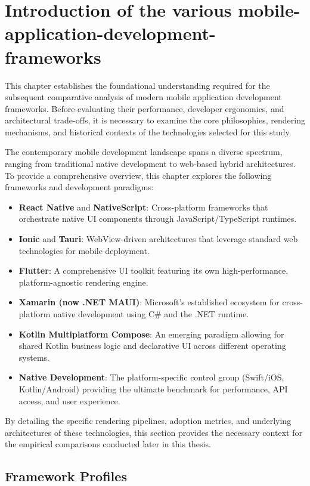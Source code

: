 \chapter{Introduction of the various mobile-application-development-frameworks}\label{chap:intro}
This chapter establishes the foundational understanding required for the subsequent comparative analysis of modern mobile application development frameworks. Before evaluating their performance, developer ergonomics, and architectural trade-offs, it is necessary to examine the core philosophies, rendering mechanisms, and historical contexts of the technologies selected for this study.

The contemporary mobile development landscape spans a diverse spectrum, ranging from traditional native development to web-based hybrid architectures.  To provide a comprehensive overview, this chapter explores the following frameworks and development paradigms:

\begin{itemize}
    \item \textbf{React Native} and \textbf{NativeScript}: Cross-platform frameworks that orchestrate native UI components through JavaScript/TypeScript runtimes.
    \item \textbf{Ionic} and \textbf{Tauri}: WebView-driven architectures that leverage standard web technologies for mobile deployment.
    \item \textbf{Flutter}: A comprehensive UI toolkit featuring its own high-performance, platform-agnostic rendering engine.
    \item \textbf{Xamarin (now .NET MAUI)}: Microsoft's established ecosystem for cross-platform native development using C\# and the .NET runtime.
    \item \textbf{Kotlin Multiplatform Compose}: An emerging paradigm allowing for shared Kotlin business logic and declarative UI across different operating systems.
    \item \textbf{Native Development}: The platform-specific control group (Swift/iOS, Kotlin/Android) providing the ultimate benchmark for performance, API access, and user experience.
\end{itemize}

By detailing the specific rendering pipelines, adoption metrics, and underlying architectures of these technologies, this section provides the necessary context for the empirical comparisons conducted later in this thesis.

\section{Framework Profiles}

